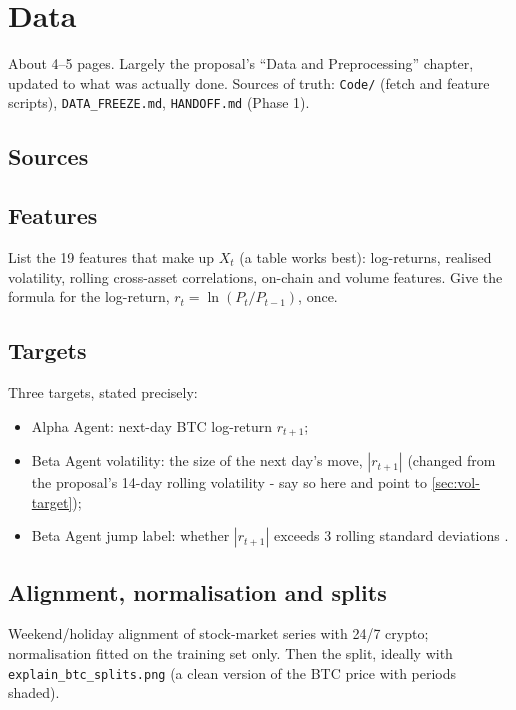 \chapter{Data}\label{ch:data}

\begin{guide}
About 4--5 pages. Largely the proposal's ``Data and Preprocessing'' chapter, updated to what was actually done. Sources of truth: \texttt{Code/} (fetch and feature scripts), \texttt{DATA\_FREEZE.md}, \texttt{HANDOFF.md} (Phase 1).
\end{guide}

\section{Sources}

\section{Features}
\begin{guide}
List the 19 features that make up $X_t$ (a table works best): log-returns, realised volatility, rolling cross-asset correlations, on-chain and volume features. Give the formula for the log-return, $r_t = \ln(P_t / P_{t-1})$, once.
\end{guide}
\tbc{}

\section{Targets}
\begin{guide}
Three targets, stated precisely:
\begin{itemize}
  \item Alpha Agent: next-day BTC log-return $r_{t+1}$;
  \item Beta Agent volatility: the size of the next day's move, $|r_{t+1}|$ (changed from the proposal's 14-day rolling volatility - say so here and point to \cref{sec:vol-target});
  \item Beta Agent jump label: whether $|r_{t+1}|$ exceeds 3 rolling standard deviations .
\end{itemize}
\end{guide}
\tbc{}

\section{Alignment, normalisation and splits}
\begin{guide}
Weekend/holiday alignment of stock-market series with 24/7 crypto; normalisation fitted on the training set only. Then the split, ideally with \texttt{explain\_btc\_splits.png} (a clean version of the BTC price with periods shaded).
\end{guide}

